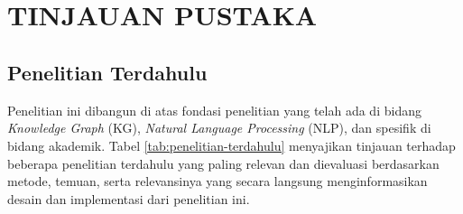 
\chapter[TINJAUAN PUSTAKA]{\\ TINJAUAN PUSTAKA}


\section{Penelitian Terdahulu}

Penelitian ini dibangun di atas fondasi penelitian yang telah ada di bidang \textit{Knowledge Graph} (KG), \textit{Natural Language Processing} (NLP), dan spesifik di bidang akademik. Tabel \ref{tab:penelitian-terdahulu} menyajikan tinjauan terhadap beberapa penelitian terdahulu yang paling relevan dan dievaluasi berdasarkan metode, temuan, serta relevansinya yang secara langsung menginformasikan desain dan implementasi dari penelitian ini.


